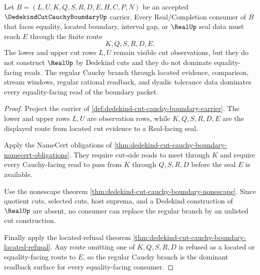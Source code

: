 \begin{theorem}
\label{thm:dedekind-cut-cauchy-boundary-regular-readback-dominance}
Let $B=(L,U,K,Q,S,R,D,E,H,C,P,N)$ be an accepted $\DedekindCutCauchyBoundaryUp$ carrier. Every Real/Completion consumer of $B$ that faces equality, located boundary, interval gap, or $\RealUp$ seal data must reach $E$ through the finite route
$$
K,Q,S,R,D,E .
$$
The lower and upper cut rows $L,U$ remain visible cut observations, but they do not construct $\RealUp$ by Dedekind cuts and they do not dominate equality-facing reads. The regular Cauchy branch through located evidence, comparison, stream windows, regular rational readback, and dyadic tolerance data dominates every equality-facing read of the boundary packet.
\end{theorem}
\begin{proof}
Project the carrier of \autoref{def:dedekind-cut-cauchy-boundary-carrier}. The lower and upper rows $L,U$ are observation rows, while $K,Q,S,R,D,E$ are the displayed route from located cut evidence to a Real-facing seal.

Apply the NameCert obligations of \autoref{thm:dedekind-cut-cauchy-boundary-namecert-obligations}. They require cut-side reads to meet through $K$ and require every Cauchy-facing read to pass from $K$ through $Q,S,R,D$ before the seal $E$ is available.

Use the nonescape theorem \autoref{thm:dedekind-cut-cauchy-boundary-nonescape}. Since quotient cuts, selected cuts, host suprema, and a Dedekind construction of $\RealUp$ are absent, no consumer can replace the regular branch by an unlisted cut construction.

Finally apply the located-refusal theorem \autoref{thm:dedekind-cut-cauchy-boundary-located-refusal}. Any route omitting one of $K,Q,S,R,D$ is refused as a located or equality-facing route to $E$, so the regular Cauchy branch is the dominant readback surface for every equality-facing consumer.
\end{proof}

